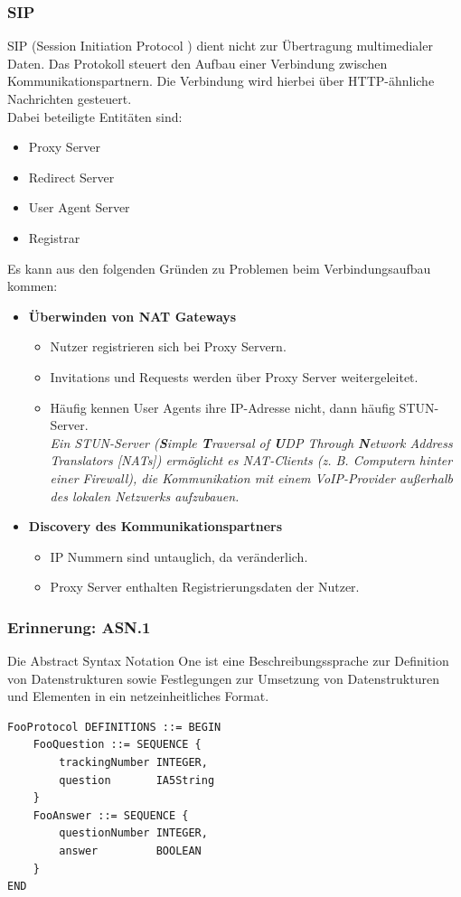 \documentclass{article} %
\begin{document}
\subsubsection{SIP}	
	SIP (Session Initiation Protocol ) dient nicht zur Übertragung multimedialer Daten. Das Protokoll steuert den Aufbau einer Verbindung zwischen Kommunikationspartnern. Die Verbindung wird hierbei über HTTP-ähnliche Nachrichten gesteuert.\\
	Dabei beteiligte Entitäten sind:
	\begin{itemize}
	\item Proxy Server 
	\item Redirect Server 
	\item User Agent Server 
	\item Registrar 
	\end{itemize}
	Es kann aus den folgenden Gründen zu Problemen beim Verbindungsaufbau kommen:
	\begin{itemize}
	\item \textbf{Überwinden von NAT Gateways} 
		\begin{itemize}
		\item Nutzer registrieren sich bei Proxy Servern. 
		\item Invitations und Requests werden über Proxy Server weitergeleitet. 
		\item Häufig kennen User Agents ihre IP-Adresse nicht, dann häufig STUN-Server. \\
		\textit{Ein STUN-Server (\textbf{S}imple \textbf{T}raversal of \textbf{U}DP Through \textbf{N}etwork Address Translators [NATs]) ermöglicht es NAT-Clients (z. B. Computern hinter einer Firewall), die Kommunikation mit einem VoIP-Provider außerhalb des lokalen Netzwerks aufzubauen.}
		\end{itemize}
	\item \textbf{Discovery des Kommunikationspartners}
		\begin{itemize}
		\item IP Nummern sind untauglich, da veränderlich. 
		\item Proxy Server enthalten Registrierungsdaten der Nutzer. 
		\end{itemize}
	\end{itemize}
	
\subsubsection{Erinnerung: ASN.1}	
	Die Abstract Syntax Notation One ist eine Beschreibungssprache zur Definition von Datenstrukturen sowie Festlegungen zur Umsetzung von Datenstrukturen und Elementen in ein netzeinheitliches Format.
	\begin{verbatim}
FooProtocol DEFINITIONS ::= BEGIN 
    FooQuestion ::= SEQUENCE { 
        trackingNumber INTEGER, 
        question       IA5String 
    } 
    FooAnswer ::= SEQUENCE { 
        questionNumber INTEGER, 
        answer         BOOLEAN 
    } 
END 
	\end{verbatim}
	
\end{document}

